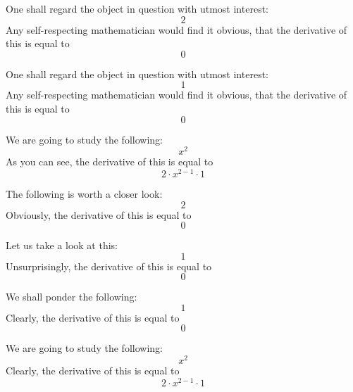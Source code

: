 \documentclass{article}
\begin{document}
One shall regard the object in question with utmost interest:
\begin{equation}
2 
\end{equation}
Any self-respecting mathematician would find it obvious, that the derivative of this is equal to
\begin{equation}
0 
\end{equation}

One shall regard the object in question with utmost interest:
\begin{equation}
1 
\end{equation}
Any self-respecting mathematician would find it obvious, that the derivative of this is equal to
\begin{equation}
0 
\end{equation}

We are going to study the following:
\begin{equation}
x ^{2 } 
\end{equation}
As you can see, the derivative of this is equal to
\begin{equation}
2 \cdot x ^{2 - 1 } \cdot 1 
\end{equation}

The following is worth a closer look:
\begin{equation}
2 
\end{equation}
Obviously, the derivative of this is equal to
\begin{equation}
0 
\end{equation}

Let us take a look at this:
\begin{equation}
1 
\end{equation}
Unsurprisingly, the derivative of this is equal to
\begin{equation}
0 
\end{equation}

We shall ponder the following:
\begin{equation}
1 
\end{equation}
Clearly, the derivative of this is equal to
\begin{equation}
0 
\end{equation}

We are going to study the following:
\begin{equation}
x ^{2 } 
\end{equation}
Clearly, the derivative of this is equal to
\begin{equation}
2 \cdot x ^{2 - 1 } \cdot 1 
\end{equation}
\end{document}
